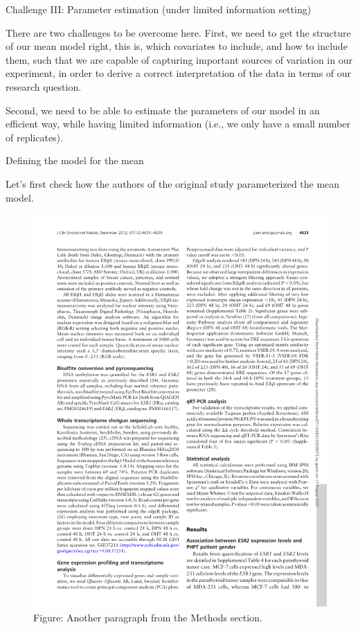 \documentclass[ignorenonframetext,]{beamer}
\begin{document}
\begin{frame}[fragile]{Challenge III: Parameter estimation (under
limited information setting)}
\protect\hypertarget{challenge-iii-parameter-estimation-under-limited-information-setting}{}

There are two challenges to be overcome here. First, we need to get the
structure of our mean model right, this is, which covariates to include,
and how to include them, such that we are capable of capturing important
sources of variation in our experiment, in order to derive a correct
interpretation of the data in terms of our research question.

Second, we need to be able to estimate the parameters of our model in an
efficient way, while having limited information (i.e., we only have a
small number of replicates).

\begin{block}{Defining the model for the mean}

Let's first check how the authors of the original study parameterized
the mean model.

\begin{figure}
\includegraphics[width=18.97in]{./images_sequencing/deAnalysis_para} \caption{Figure: Another paragraph from the Methods section.}\label{fig:unnamed-chunk-14}
\end{figure}


\end{block}
\end{frame}
\end{document}
